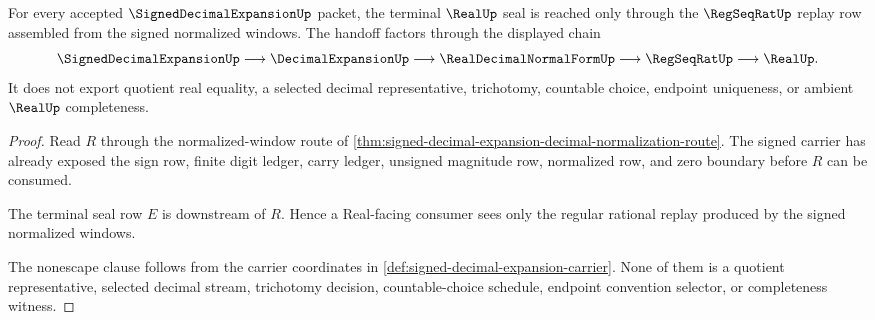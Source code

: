 \begin{theorem}
\label{thm:signed-decimal-expansion-real-seal-handoff}
For every accepted $\SignedDecimalExpansionUp$ packet, the terminal $\RealUp$ seal is reached only through the $\RegSeqRatUp$ replay row assembled from the signed normalized windows. The handoff factors through the displayed chain
$$
\SignedDecimalExpansionUp
\longrightarrow
\DecimalExpansionUp
\longrightarrow
\RealDecimalNormalFormUp
\longrightarrow
\RegSeqRatUp
\longrightarrow
\RealUp .
$$
It does not export quotient real equality, a selected decimal representative, trichotomy, countable choice, endpoint uniqueness, or ambient $\RealUp$ completeness.
\end{theorem}
\begin{proof}
Read $R$ through the normalized-window route of \autoref{thm:signed-decimal-expansion-decimal-normalization-route}. The signed carrier has already exposed the sign row, finite digit ledger, carry ledger, unsigned magnitude row, normalized row, and zero boundary before $R$ can be consumed.

The terminal seal row $E$ is downstream of $R$. Hence a Real-facing consumer sees only the regular rational replay produced by the signed normalized windows.

The nonescape clause follows from the carrier coordinates in \autoref{def:signed-decimal-expansion-carrier}. None of them is a quotient representative, selected decimal stream, trichotomy decision, countable-choice schedule, endpoint convention selector, or completeness witness.
\end{proof}


\begin{closurestatus}{\SignedDecimalExpansionUp}
  \theoryclosure{\seedClosure}
  \formalstatus{\unformalizedV}
\end{closurestatus}
